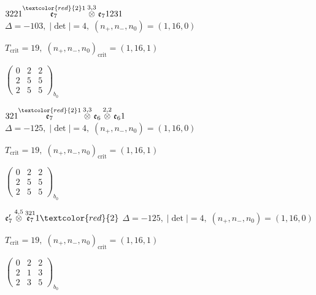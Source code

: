\documentclass[10pt]{article}
\begin{document}
\smallskip

$3221\overset{\textcolor{red}{2}1}{\mathfrak{e}_7}\overset{3,3}{\otimes}\mathfrak{e}_71231$ \quad $\Delta=-103,\; |\det|=4,\; (n_+,n_-,n_0)=(1,16,0)$

\hspace{1em}$T_{\text{crit}}=19,\; (n_+,n_-,n_0)_{\text{crit}}=(1,16,1)$

\hspace{2em}$\left(\begin{smallmatrix}0 & 2 & 2 \\ 2 & 5 & 5 \\ 2 & 5 & 5\end{smallmatrix}\right)_{\!b_0}$

\smallskip

$321\overset{\textcolor{red}{2}1}{\mathfrak{e}_7}\overset{3,3}{\otimes}\mathfrak{e}_6\overset{2,2}{\otimes}\mathfrak{e}_61$ \quad $\Delta=-125,\; |\det|=4,\; (n_+,n_-,n_0)=(1,16,0)$

\hspace{1em}$T_{\text{crit}}=19,\; (n_+,n_-,n_0)_{\text{crit}}=(1,16,1)$

\hspace{2em}$\left(\begin{smallmatrix}0 & 2 & 2 \\ 2 & 5 & 5 \\ 2 & 5 & 5\end{smallmatrix}\right)_{\!b_0}$

\smallskip

$\mathfrak{e}_7'\overset{4,5}{\otimes}\overset{321}{\mathfrak{e}_7}1\textcolor{red}{2}$ \quad $\Delta=-125,\; |\det|=4,\; (n_+,n_-,n_0)=(1,16,0)$

\hspace{1em}$T_{\text{crit}}=19,\; (n_+,n_-,n_0)_{\text{crit}}=(1,16,1)$

\hspace{2em}$\left(\begin{smallmatrix}0 & 2 & 2 \\ 2 & 1 & 3 \\ 2 & 3 & 5\end{smallmatrix}\right)_{\!b_0}$
\end{document}
